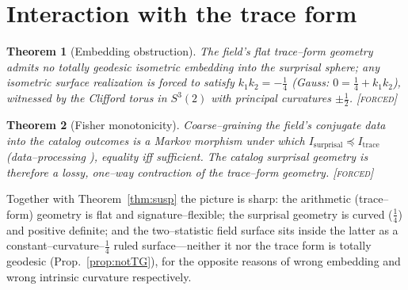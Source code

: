 \documentclass[11pt]{article}
\newtheorem{theorem}{Theorem}[section]
\theoremstyle{definition}
\newcommand{\forcedtag}{{\scshape [forced]}}
\begin{document}
\section{Interaction with the trace form}
\begin{theorem}[Embedding obstruction]\label{thm:embed}
The field's flat trace--form geometry admits no totally geodesic isometric embedding into the
surprisal sphere; any isometric surface realization is forced to satisfy $k_1k_2=-\tfrac14$
(Gauss: $0=\tfrac14+k_1k_2$), witnessed by the Clifford torus in $S^3(2)$ with principal curvatures
$\pm\tfrac12$. \forcedtag
\end{theorem}

\begin{theorem}[Fisher monotonicity]\label{thm:mono}
Coarse--graining the field's conjugate data into the catalog outcomes is a Markov morphism under
which $I_{\mathrm{surprisal}}\preceq I_{\mathrm{trace}}$ (data--processing \cite{zamir,chentsov}),
equality iff sufficient. The catalog surprisal geometry is therefore a lossy, one--way contraction
of the trace--form geometry. \forcedtag
\end{theorem}

Together with Theorem~\ref{thm:susp} the picture is sharp: the arithmetic (trace--form) geometry is
flat and signature--flexible; the surprisal geometry is curved ($\tfrac14$) and positive definite;
and the two--statistic field surface sits inside the latter as a constant--curvature--$\tfrac14$ ruled
surface---neither it nor the trace form is totally geodesic (Prop.~\ref{prop:notTG}), for the opposite
reasons of wrong embedding and wrong intrinsic curvature respectively.
\end{document}
